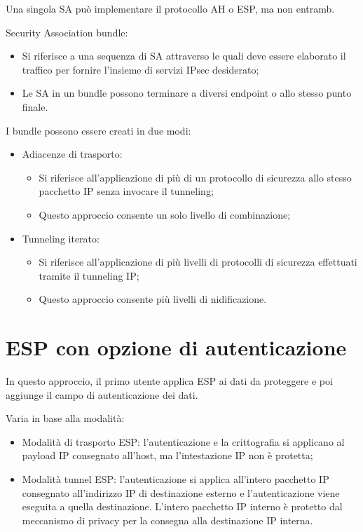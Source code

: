 Una singola SA può implementare il protocollo AH o ESP, ma non entramb.

Security Association bundle:
\begin{itemize}
    \item Si riferisce a una sequenza di SA attraverso le quali deve essere elaborato il traffico per fornire l'insieme di servizi IPsec desiderato;
	\item Le SA in un bundle possono terminare a diversi endpoint o allo stesso punto finale.
\end{itemize}

I bundle possono essere creati in due modi:
\begin{itemize}
    \item Adiacenze di trasporto:
	\begin{itemize}
	    \item Si riferisce all'applicazione di più di un protocollo di sicurezza allo stesso pacchetto IP senza invocare il tunneling;
		\item Questo approccio consente un solo livello di combinazione;
	\end{itemize}
	\item Tunneling iterato:
	\begin{itemize}
	    \item Si riferisce all'applicazione di più livelli di protocolli di sicurezza effettuati tramite il tunneling IP;
		\item Questo approccio consente più livelli di nidificazione.
	\end{itemize}
\end{itemize}

\section{ESP con opzione di autenticazione}

In questo approccio, il primo utente applica ESP ai dati da proteggere e poi aggiunge il campo di autenticazione dei dati. 

Varia in base alla modalità:
\begin{itemize}
    \item Modalità di trasporto ESP: l'autenticazione e la crittografia si applicano al payload IP consegnato all'host, ma l'intestazione IP non è protetta;
	\item Modalità tunnel ESP: l'autenticazione si applica all'intero pacchetto IP consegnato all'indirizzo IP di destinazione esterno e l'autenticazione viene eseguita a quella destinazione. L'intero pacchetto IP interno è protetto dal meccanismo di privacy per la consegna alla destinazione IP interna.
\end{itemize}

